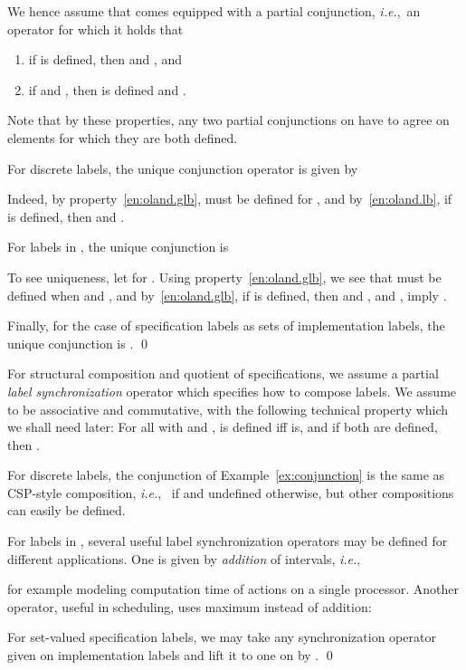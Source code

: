 \documentclass[twocolumn]{svjour3-dummy}
\newcommand*\ie{\textit{i.e.},}
\begin{document}
We hence assume that  comes equipped with a partial conjunction,
\ie~an operator  for which it
holds that
\begin{enumerate}[(1)]
\item \label{en:oland.lb} if  is defined, then  and , and
\item \label{en:oland.glb} if  and , then
   is defined and .
\end{enumerate}
Note that by these properties, any two partial conjunctions on 
have to agree on elements for which they are both defined.

\begin{example}
  \label{ex:conjunction}
  For discrete labels, the unique conjunction operator is given by
  
  Indeed, by property~\eqref{en:oland.glb},  must be
  defined for , and by~\eqref{en:oland.lb}, if  is defined, then  and .

  For labels in ,
  the unique conjunction is
  
  To see uniqueness, let  for .
  Using property~\eqref{en:oland.glb}, we see that 
  must be defined when  and , and by~\eqref{en:oland.glb}, if  is
  defined, then  and , and ,  imply .

  Finally, for the case of specification labels as sets of
  implementation labels, the unique conjunction is . \qed
\end{example}

For structural composition and quotient of specifications, we assume a
partial \emph{label synchronization} operator  which specifies how to compose
labels.  We assume  to be associative and commutative, with the
following technical property which we shall need later: For all  with  and ,
 is defined iff  is, and if both are
defined, then .

\begin{example}
  \label{ex:composition}
  For discrete labels, the conjunction of Example~\ref{ex:conjunction}
  is the same as CSP-style composition, \ie~ if  and
  undefined otherwise, but other compositions can easily be defined.

  For labels in , several
  useful label synchronization operators may be defined for different
  applications.  One is given by \emph{addition} of intervals, \ie
  
  for example modeling computation time of actions on a single
  processor.  Another operator, useful in scheduling, uses maximum
  instead of addition:
  

  For set-valued specification labels, we may take any synchronization
  operator  given on implementation labels  and lift it
  to one on  by . \qed
\end{example}
\end{document}
